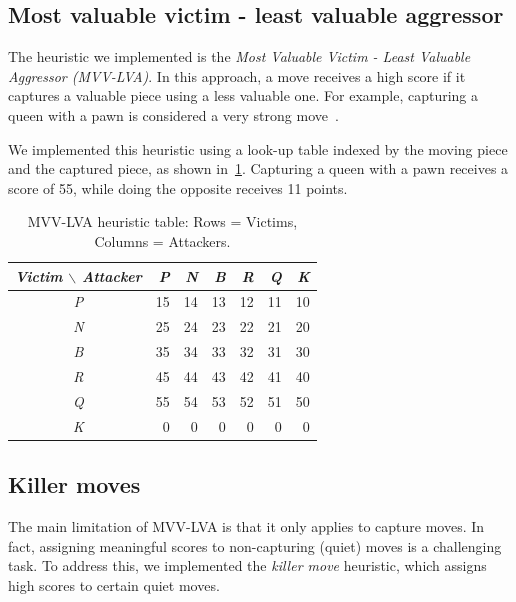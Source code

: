 \subsection*{Most valuable victim - least valuable aggressor}

The heuristic we implemented is the \textit{Most Valuable Victim - Least Valuable Aggressor (MVV-LVA)}. In this approach, a move receives a high score if it captures a valuable piece using a less valuable one. For example, capturing a queen with a pawn is considered a very strong move~\cite{MVVLVA}.

\vspace{1em}

\noindent We implemented this heuristic using a look-up table indexed by the moving piece and the captured piece, as shown in~\cref{tab:mvv-lva-table}. Capturing a queen with a pawn receives a score of 55, while doing the opposite receives 11 points.

\begin{table}[H]
    \centering
    \begin{tabular}{|c|r|r|r|r|r|r|}
        \hline
        \textit{Victim $\backslash$ Attacker} & \textit{P} & \textit{N} & \textit{B} & \textit{R} & \textit{Q} & \textit{K} \\
        \hline
        \textit{P}     & 15 & 14 & 13 & 12 & 11 & 10 \\
        \hline
        \textit{N}     & 25 & 24 & 23 & 22 & 21 & 20 \\
        \hline
        \textit{B}     & 35 & 34 & 33 & 32 & 31 & 30 \\
        \hline
        \textit{R}     & 45 & 44 & 43 & 42 & 41 & 40 \\
        \hline
        \textit{Q}     & 55 & 54 & 53 & 52 & 51 & 50 \\
        \hline
        \textit{K}     &  0 &  0 &  0 &  0 &  0 &  0 \\
        \hline
    \end{tabular}
    \caption{MVV-LVA heuristic table: Rows = Victims, Columns = Attackers.}\label{tab:mvv-lva-table}
\end{table}

\subsection*{Killer moves}

The main limitation of MVV-LVA is that it only applies to capture moves. In fact, assigning meaningful scores to non-capturing (quiet) moves is a challenging task. To address this, we implemented the \textit{killer move} heuristic, which assigns high scores to certain quiet moves.

